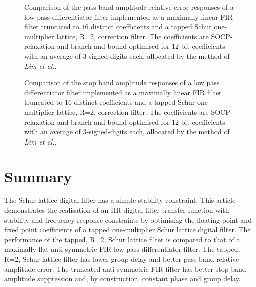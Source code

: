 \documentclass[a4paper,twoside,10pt,english]{article}
\newcommand{\DesignOfSchurLatticeFiltersPdfScale}{1}
\begin{document}
\begin{figure}
\centering
\scalebox{\DesignOfSchurLatticeFiltersPdfScale}{}
\caption{Comparison of the pass band amplitude relative error responses of a low
  pass differentiator filter implemented as a maximally linear FIR filter
  truncated to $16$ distinct coefficients and a tapped Schur one-multiplier
  lattice, R=2, correction filter. The coefficients are SOCP-relaxation and
  branch-and-bound optimised for $12$-bit coefficients with an average of
  $3$-signed-digits each, allocated by the method of \emph{Lim et al.}\;.}
\label{fig:Comp-schurOneMlattice-lowpass-diff-R2-12-nbits-Schur-FIR-pass-relative}
\end{figure}

\begin{figure}
\centering
\scalebox{\DesignOfSchurLatticeFiltersPdfScale}{}
\caption{Comparison of the stop band amplitude responses of a low pass
  differentiator filter implemented as a maximally linear FIR filter truncated
  to $16$ distinct coefficients and a tapped Schur one-multiplier lattice, R=2,
  correction filter. The coefficients are SOCP-relaxation and branch-and-bound
  optimised for $12$-bit coefficients with an average of
  $3$-signed-digits each, allocated by the method of \emph{Lim et al.}\;.}
\label{fig:Comp-schurOneMlattice-lowpass-diff-R2-12-nbits-Schur-FIR-stop}
\end{figure}

\clearpage
\section{Summary}
The Schur lattice digital filter has a simple stability constraint. This article
demonstrates the realisation of an IIR digital filter transfer function with
stability and frequency response constraints by optimising the floating point
and fixed point coefficients of a tapped one-multiplier Schur lattice digital
filter. The performance of the tapped, R=2, Schur lattice filter is compared
to that of a maximally-flat anti-symmetric FIR low pass differentiator filter.
The tapped, R=2, Schur lattice filter has lower group delay and better pass band
relative amplitude error. The truncated anti-symmetric FIR filter has better
stop band amplitude suppression and, by construction, constant phase and group
delay.



\end{document}
